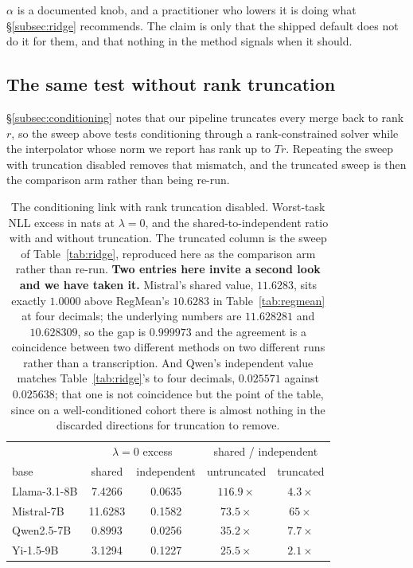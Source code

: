 $\alpha$ is a documented knob, and a practitioner who lowers it is doing what
\S\ref{subsec:ridge} recommends. The claim is only that the shipped default does
not do it for them, and that nothing in the method signals when it should.

\subsection{The same test without rank truncation}
\label{subsec:untruncated}

\S\ref{subsec:conditioning} notes that our pipeline truncates every merge
back to rank $r$, so the sweep above tests conditioning through a
rank-constrained solver while the interpolator whose norm we report has
rank up to $Tr$. Repeating the sweep with truncation disabled removes that
mismatch, and the truncated sweep is then the comparison arm rather than
being re-run.

\begin{table}[htb]
\centering
\small
\caption{The conditioning link with rank truncation disabled. Worst-task NLL
excess in nats at $\lambda = 0$, and the shared-to-independent ratio with and
without truncation. The truncated column is the sweep of
Table~\ref{tab:ridge}, reproduced here as the comparison arm rather than
re-run. \textbf{Two entries here invite a second look and we have taken it.}
Mistral's shared value, $11.6283$, sits exactly $1.0000$ above RegMean's
$10.6283$ in Table~\ref{tab:regmean} at four decimals; the underlying numbers
are $11.628281$ and $10.628309$, so the gap is $0.999973$ and the agreement is
a coincidence between two different methods on two different runs rather than
a transcription. And Qwen's independent value matches
Table~\ref{tab:ridge}'s to four decimals, $0.025571$ against $0.025638$;
that one is not coincidence but the point of the table, since on a
well-conditioned cohort there is almost nothing in the discarded directions
for truncation to remove.}
\label{tab:untruncated}
\begin{tabular}{lcccc}
\toprule
 & \multicolumn{2}{c}{$\lambda = 0$ excess} & \multicolumn{2}{c}{shared / independent} \\
base & shared & independent & untruncated & truncated \\
\midrule
Llama-3.1-8B & 7.4266  & 0.0635 & $116.9\times$ & $4.3\times$ \\
Mistral-7B   & 11.6283 & 0.1582 & $73.5\times$  & $65\times$ \\
Qwen2.5-7B   & 0.8993  & 0.0256 & $35.2\times$  & $7.7\times$ \\
Yi-1.5-9B    & 3.1294  & 0.1227 & $25.5\times$  & $2.1\times$ \\
\bottomrule
\end{tabular}
\end{table}

